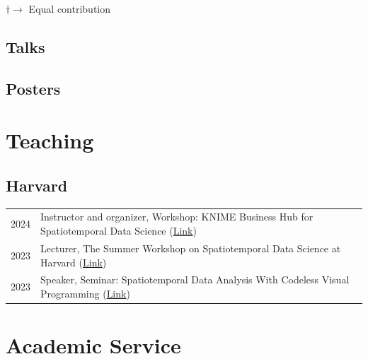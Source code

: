 \documentclass[11pt]{article}
\begin{document}
\vspace{-.75em}
\small
$\dagger \rightarrow$ Equal contribution
\normalsize

\subsection*{Talks}
\label{talks}
\newrefcontext[labelprefix=T]
\printbibliography[type=misc,heading=none,resetnumbers=true,keyword=T]

\subsection*{Posters}
\label{posters}
\newrefcontext[labelprefix=P]
\printbibliography[type=misc,heading=none,resetnumbers=true,keyword=P]

\section*{Teaching}
\label{teaching}

\subsection*{Harvard}

\begin{longtable}[l]{@{}p{} p{}}

	2024 & Instructor and organizer, Workshop: KNIME Business Hub for Spatiotemporal Data Science (\href{https://gis.harvard.edu/event/workshop-web-based-workflows-reproducible-and-shareable-spatiotemporal-data-analysis}{Link}) \\
	2023 & Lecturer, The Summer Workshop on Spatiotemporal Data Science at Harvard (\href{https://sdl.gis.harvard.edu/event/summer-workshop-spatiotemporal-innovation-0}{Link})                                                     \\
	2023 & Speaker, Seminar: Spatiotemporal Data Analysis With Codeless Visual Programming (\href{https://gis.harvard.edu/event/spatiotemporal-data-analysis-codeless-visual-programming}{Link})                                    \\
\end{longtable}

\section*{Academic Service}
\label{service}
\end{document}
